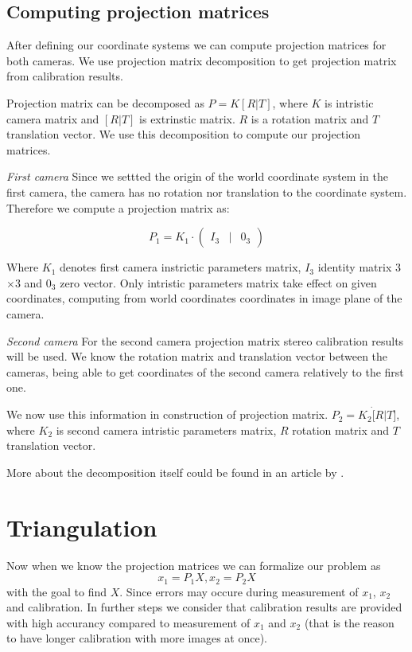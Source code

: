 \subsection{Computing projection matrices}
After defining our coordinate systems we can compute projection matrices for
both cameras. We use projection matrix decomposition to get projection matrix
from calibration results.

Projection matrix can be decomposed as $P = K[R|T]$, where $K$ is intristic
camera matrix and $[R|T]$ is extrinstic matrix. $R$ is a rotation matrix and
$T$ translation vector. We use this decomposition to compute our projection
matrices.

\emph{First camera}
Since we settted the origin of the world coordinate system in the first camera,
the camera has no rotation nor translation to the coordinate system. Therefore
we compute a projection matrix as:

\[
 P_1 = K_1 \cdot \begin{pmatrix}
	I_3 & | & 0_3  
\end{pmatrix}
\]

Where $K_1$ denotes first camera instrictic parameters matrix, $I_3$ identity
matrix 3$\times$3 and $0_3$ zero vector. Only intristic parameters matrix take
effect on given coordinates, computing from world coordinates coordinates in
image plane of the camera.

\emph{Second camera}
For the second camera projection matrix stereo calibration results will be
used. We know the rotation matrix and translation vector between the cameras,
being able to get coordinates of the second camera relatively to the first one.

We now use this information in construction of projection matrix. $P_2 = K_2
\dot [R | T]$, where $K_2$ is second camera intristic parameters matrix, $R$
rotation matrix and $T$ translation vector.

More about the decomposition itself could be found in an article by
\citet{computervisionblog}.


\section{Triangulation}
Now when we know the projection matrices we can formalize our problem as
\begin{equation}
x_1 = P_1X, x_2 = P_2X \label{projection-statements}
\end{equation}
with the goal to find $X$. Since errors may occure during
measurement of $x_1$, $x_2$ and calibration. In further steps we consider that
calibration results are provided with high accurancy compared to measurement of
$x_1$ and $x_2$ (that is the reason to have longer calibration with more images
at once).


